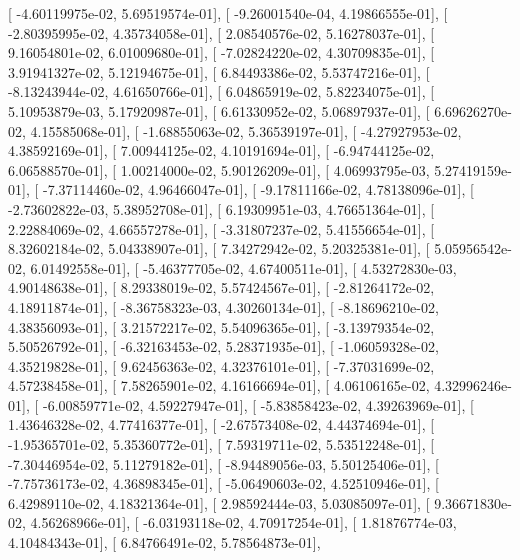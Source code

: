 \documentclass{article}
\begin{document}
       [ -4.60119975e-02,   5.69519574e-01],
       [ -9.26001540e-04,   4.19866555e-01],
       [ -2.80395995e-02,   4.35734058e-01],
       [  2.08540576e-02,   5.16278037e-01],
       [  9.16054801e-02,   6.01009680e-01],
       [ -7.02824220e-02,   4.30709835e-01],
       [  3.91941327e-02,   5.12194675e-01],
       [  6.84493386e-02,   5.53747216e-01],
       [ -8.13243944e-02,   4.61650766e-01],
       [  6.04865919e-02,   5.82234075e-01],
       [  5.10953879e-03,   5.17920987e-01],
       [  6.61330952e-02,   5.06897937e-01],
       [  6.69626270e-02,   4.15585068e-01],
       [ -1.68855063e-02,   5.36539197e-01],
       [ -4.27927953e-02,   4.38592169e-01],
       [  7.00944125e-02,   4.10191694e-01],
       [ -6.94744125e-02,   6.06588570e-01],
       [  1.00214000e-02,   5.90126209e-01],
       [  4.06993795e-03,   5.27419159e-01],
       [ -7.37114460e-02,   4.96466047e-01],
       [ -9.17811166e-02,   4.78138096e-01],
       [ -2.73602822e-03,   5.38952708e-01],
       [  6.19309951e-03,   4.76651364e-01],
       [  2.22884069e-02,   4.66557278e-01],
       [ -3.31807237e-02,   5.41556654e-01],
       [  8.32602184e-02,   5.04338907e-01],
       [  7.34272942e-02,   5.20325381e-01],
       [  5.05956542e-02,   6.01492558e-01],
       [ -5.46377705e-02,   4.67400511e-01],
       [  4.53272830e-03,   4.90148638e-01],
       [  8.29338019e-02,   5.57424567e-01],
       [ -2.81264172e-02,   4.18911874e-01],
       [ -8.36758323e-03,   4.30260134e-01],
       [ -8.18696210e-02,   4.38356093e-01],
       [  3.21572217e-02,   5.54096365e-01],
       [ -3.13979354e-02,   5.50526792e-01],
       [ -6.32163453e-02,   5.28371935e-01],
       [ -1.06059328e-02,   4.35219828e-01],
       [  9.62456363e-02,   4.32376101e-01],
       [ -7.37031699e-02,   4.57238458e-01],
       [  7.58265901e-02,   4.16166694e-01],
       [  4.06106165e-02,   4.32996246e-01],
       [ -6.00859771e-02,   4.59227947e-01],
       [ -5.83858423e-02,   4.39263969e-01],
       [  1.43646328e-02,   4.77416377e-01],
       [ -2.67573408e-02,   4.44374694e-01],
       [ -1.95365701e-02,   5.35360772e-01],
       [  7.59319711e-02,   5.53512248e-01],
       [ -7.30446954e-02,   5.11279182e-01],
       [ -8.94489056e-03,   5.50125406e-01],
       [ -7.75736173e-02,   4.36898345e-01],
       [ -5.06490603e-02,   4.52510946e-01],
       [  6.42989110e-02,   4.18321364e-01],
       [  2.98592444e-03,   5.03085097e-01],
       [  9.36671830e-02,   4.56268966e-01],
       [ -6.03193118e-02,   4.70917254e-01],
       [  1.81876774e-03,   4.10484343e-01],
       [  6.84766491e-02,   5.78564873e-01],
\end{document}
